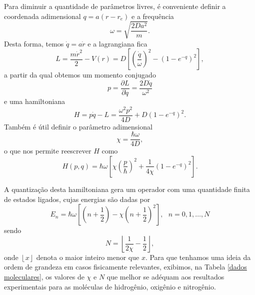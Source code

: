 \documentclass[
	12pt,
	oneside,			%
	a4paper,			%
	english,			%
	brazil				%
	]{abntex2}
\theoremstyle{definition}
\begin{document}
Para diminuir a quantidade de parâmetros livres, é conveniente definir a coordenada adimensional $q = a(r-r_e)$ e a frequência
\begin{equation}
    \omega = \sqrt{\frac{2Da^2}{m}}.
\end{equation}
Desta forma, temos $\dot{q} = a \dot{r}$ e a lagrangiana fica
\begin{equation}
    L = \frac{m \dot{r}^2}{2} - V(r) = D \left[ \left( \frac{\dot{q}}{\omega} \right)^2 - \left( 1-e^{-q} \right)^2 \right],
\end{equation}
a partir da qual obtemos um momento conjugado
\begin{equation}
    p = \frac{\partial L}{\partial \dot{q}} = \frac{2D\dot{q}}{\omega^2}
\end{equation}
e uma hamiltoniana
\begin{equation}
    H = p \dot{q} - L = \frac{\omega^2p^2}{4D} + D\left(1-e^{-q}\right)^2.
\end{equation}
Também é útil definir o parâmetro adimensional
\begin{equation}
    \chi = \frac{\hbar \omega}{4D},
\end{equation}
o que nos permite reescrever $H$ como
\begin{equation}
    H(p,q) = \hbar \omega \left[ \chi \left( \frac{p}{\hbar} \right)^2 + \frac{1}{4\chi}\left( 1-e^{-q} \right)^2 \right].
\end{equation}

A quantização desta hamiltoniana gera um operador com uma quantidade finita de estados ligados, cujas energias são dadas por
\begin{equation}
    E_n = \hbar \omega \left[ \left( n + \frac{1}{2} \right) - \chi \left( n + \frac{1}{2} \right)^2 \right], \ \ \ n = 0,1, \ldots, N
\end{equation}
sendo
\begin{equation}
\label{numero de estados ligados}
    N=\left \lfloor{\frac{1}{2\chi} - \frac{1}{2}}\right \rfloor, 
\end{equation}
onde $\left \lfloor{x}\right \rfloor $ denota o maior inteiro menor que $x$. Para que tenhamos uma ideia da ordem de grandeza em casos fisicamente relevantes, exibimos, na Tabela \ref{dados moleculares}, os valores de $\chi$ e $N$ que melhor se adéquam aos resultados experimentais para as moléculas de hidrogênio, oxigênio e nitrogênio.
\end{document}
